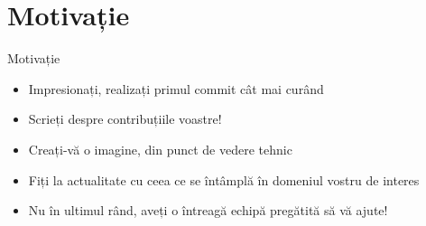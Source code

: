 \documentclass{beamer}
\begin{document}
\section{Motivație}

\begin{frame}{Motivație}
  \begin{itemize} %
  \pause
  \vskip17pt
  \item Impresionați, realizați primul commit cât mai curând
  \pause
  \vskip17pt
  \item Scrieți despre contribuțiile voastre!
  \pause
  \vskip17pt
  \item Creați-vă o imagine, din punct de vedere tehnic
  \pause
  \vskip17pt
  \item Fiți la actualitate cu ceea ce se întâmplă în domeniul vostru de
  interes
  \pause
  \vskip17pt
  \item Nu în ultimul rând, aveți o întreagă echipă pregătită să vă ajute!
  \pause
  \end{itemize}
\end{frame}
\end{document}
